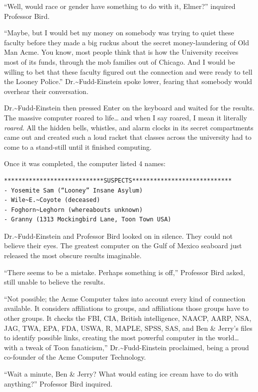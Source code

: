 \documentclass[captions=tableheading]{scrbook}
\begin{document}
“Well, would race or gender have something to do with it, Elmer?” inquired Professor Bird.

“Maybe, but I would bet my money on somebody was trying to quiet these faculty before they made a big ruckus about the secret money-laundering of Old Man Acme. You know, most people think that is how the University receives most of its funds, through the mob families out of Chicago. And I would be willing to bet that these faculty figured out the connection and were ready to tell the Looney Police.” Dr.\~{}Fudd-Einstein spoke lower, fearing that somebody would overhear their conversation.  

Dr.\~{}Fudd-Einstein then pressed \textsf{Enter} on the keyboard and waited for the results. The massive computer roared to life\ldots{} and when I say roared, I mean it literally \emph{roared}. All the hidden bells, whistles, and alarm clocks in its secret compartments came out and created such a loud racket that classes across the university had to come to a stand-still until it finished computing. 

Once it was completed, the computer listed 4 names:


\begin{verbatim}
****************************SUSPECTS****************************
- Yosemite Sam (“Looney” Insane Asylum) 
- Wile~E.~Coyote (deceased) 
- Foghorn~Leghorn (whereabouts unknown) 
- Granny (1313 Mockingbird Lane, Toon Town USA)
\end{verbatim}

Dr.\~{}Fudd-Einstein and Professor Bird looked on in silence. They could not believe their eyes. The greatest computer on the Gulf of Mexico seaboard just released the most obscure results imaginable.

“There seems to be a mistake. Perhaps something is off,” Professor Bird asked, still unable to believe the results.

“Not possible; the Acme Computer takes into account every kind of connection available. It considers affiliations to groups, and affiliations those groups have to other groups. It checks the FBI, CIA, British intelligence, NAACP, AARP, NSA, JAG, TWA, EPA, FDA, USWA, \textsf{R}, MAPLE, SPSS, SAS, and Ben \& Jerry’s files to identify possible links, creating the most powerful computer in the world\ldots{} with a tweak of Toon fanaticism,” Dr.\~{}Fudd-Einstein proclaimed, being a proud co-founder of the Acme Computer Technology.

“Wait a minute, Ben \& Jerry? What would eating ice cream have to do with anything?” Professor Bird inquired.
\end{document}
